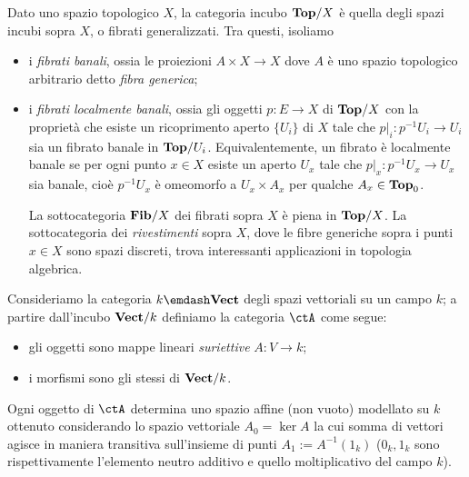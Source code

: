\begin{example}\label{ex_fibrati_rivestimenti}
	Dato uno spazio topologico \(X\), la categoria incubo \(\mathbf{Top}/X\) è quella degli spazi incubi sopra \(X\), o fibrati generalizzati. Tra questi, isoliamo
	\begin{itemize}
		\item i \emph{fibrati banali}, ossia le proiezioni \(A\times X \to X\) dove \(A\) è uno spazio topologico arbitrario detto \emph{fibra generica};
		\item i \emph{fibrati localmente banali}, ossia gli oggetti \(p : E\to X\) di \(\mathbf{Top}/X\) con la proprietà che esiste un ricoprimento aperto \(\{U_i\}\) di \(X\) tale che \(p|_i : p^{-1}U_i\to U_i\) sia un fibrato banale in \(\mathbf{Top}/U_i\). Equivalentemente, un fibrato è localmente banale se per ogni punto \(x\in X\) esiste un aperto \(U_x\) tale che \(p|_x : p^{-1}U_x\to U_x\) sia banale, cioè \(p^{-1}U_x\) è omeomorfo a \(U_x\times A_x\) per qualche \(A_x\in\mathbf{Top}_0\).

		      La sottocategoria \(\mathbf{Fib}/X\) dei fibrati sopra \(X\) è piena in \(\mathbf{Top}/X\). La sottocategoria dei \emph{rivestimenti} sopra \(X\), dove le fibre generiche sopra i punti \(x\in X\) sono spazi discreti, trova interessanti applicazioni in topologia algebrica.
	\end{itemize}
\end{example}
\begin{example}\label{ex_affini}
	Consideriamo la categoria \(k\emdash\ctVect\) degli spazi vettoriali su un campo \(k\); a partire dall'incubo \(\mathbf{Vect}/k\) definiamo la categoria \(\ctA\) come segue:
	\begin{itemize}
		\item gli oggetti sono mappe lineari \emph{suriettive} \(A : V\to k\);
		\item i morfismi sono gli stessi di \(\mathbf{Vect}/k\).
	\end{itemize}
	Ogni oggetto di \(\ctA\) determina uno spazio affine (non vuoto) modellato su \(k\) ottenuto considerando lo spazio vettoriale \(A_0 = \ker A\) la cui somma di vettori agisce in maniera transitiva sull'insieme di punti \(A_1 := A^{-1}(1_k)\) (\(0_k,1_k\) sono rispettivamente l'elemento neutro additivo e quello moltiplicativo del campo \(k\)).
\end{example}
